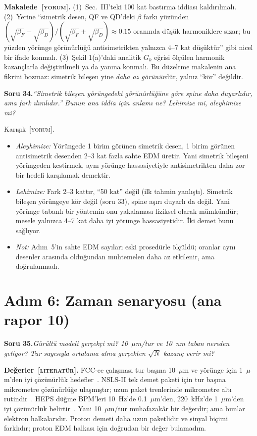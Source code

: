 \documentclass[11pt,a4paper]{article}
\newcommand{\YOR}{\textsc{[yorum]}}
\newcommand{\LIT}{\textsc{[literatür]}}
\newcounter{soru}
\newcommand{\soru}[2]{%
  \par\medskip\noindent\textbf{Soru #1.}\enspace\textit{#2}\par\nopagebreak\smallskip}
\begin{document}
\textbf{Makalede~\YOR.} (1)~Sec.~III'teki 100 kat bastırma iddiası kaldırılmalı. (2)~Yerine ``simetrik
desen, QF ve QD'deki $\beta$ farkı yüzünden $(\sqrt{\beta_F}-\sqrt{\beta_D})/(\sqrt{\beta_F}+\sqrt{\beta_D})
\approx0.15$ oranında düşük harmoniklere sızar; bu yüzden yörünge görünürlüğü antisimetrikten yalnızca
4--7 kat düşüktür'' gibi nicel bir ifade konmalı. (3)~Şekil 1(a)'daki analitik $G_k$ eğrisi ölçülen
harmonik kazançlarla değiştirilmeli ya da yanına konmalı. Bu düzeltme makalenin ana fikrini bozmaz:
simetrik bileşen yine \emph{daha az görünür}dür, yalnız ``kör'' değildir.

\soru{34}{``Simetrik bileşen yörüngedeki görünürlüğüne göre spine daha duyarlıdır, ama fark ılımlıdır.''
Bunun ana iddia için anlamı ne? Lehimize mi, aleyhimize mi?}

Karışık~\YOR.
\begin{itemize}[nosep]
\item \emph{Aleyhimize:} Yörüngede 1 birim görünen simetrik desen, 1 birim görünen antisimetrik desenden
2--3 kat fazla sahte EDM üretir. Yani simetrik bileşeni yörüngeden kestirmek, aynı yörünge hassasiyetiyle
antisimetrikten daha zor bir hedefi karşılamak demektir.
\item \emph{Lehimize:} Fark 2--3 kattır, ``50 kat'' değil (ilk tahmin yanlıştı). Simetrik bileşen yörüngeye
kör değil (soru 33), spine aşırı duyarlı da değil. Yani yörünge tabanlı bir yöntemin onu yakalaması
fiziksel olarak mümkündür; mesele yalnızca 4--7 kat daha iyi yörünge hassasiyetidir. İki demet bunu
sağlıyor.
\item \emph{Not:} Adım~5'in sahte EDM sayıları eski prosedürle ölçüldü; oranlar aynı desenler arasında
olduğundan muhtemelen daha az etkilenir, ama doğrulanmadı.
\end{itemize}

\section{Adım 6: Zaman senaryosu (ana rapor 10)}

\soru{35}{Gürültü modeli gerçekçi mi? 10~$\mu$m/tur ve 10~nm taban nereden geliyor? Tur sayısıyla ortalama
alma gerçekten $\sqrt N$ kazanç verir mi?}

\textbf{Değerler~\LIT.} FCC-ee çalışması tur başına 10~$\mu$m ve yörünge için 1~$\mu$m'den iyi çözünürlük
hedefler~\cite{fccee}. NSLS-II tek demet paketi için tur başına mikrometre çözünürlüğe ulaşmıştır; uzun paket
trenlerinde mikrometre altı rutindir~\cite{nsls2}. HEPS düğme BPM'leri 10~Hz'de 0.1~$\mu$m'den,
220~kHz'de 1~$\mu$m'den iyi çözünürlük belirtir~\cite{heps}. Yani 10~$\mu$m/tur muhafazakâr bir değerdir;
ama bunlar elektron halkalarıdır. Proton demeti daha uzun paketlidir ve sinyal biçimi farklıdır; proton
EDM halkası için doğrudan bir değer bulamadım.
\end{document}
